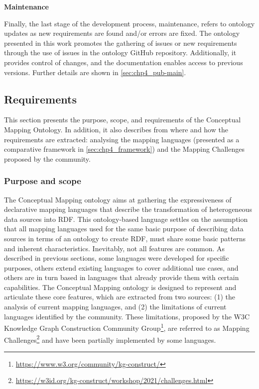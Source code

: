 \noindent\textbf{Maintenance}

Finally, the last stage of the development process, maintenance, refers to ontology updates as new requirements are found and/or errors are fixed. The ontology presented in this work promotes the gathering of issues or new requirements through the use of issues in the ontology GitHub repository. Additionally, it provides control of changes, and the documentation enables access to previous versions. Further details are shown in \cref{sec:chp4_pub-main}.



\subsection{Requirements}
\label{sec:chp4_requirements}

This section presents the purpose, scope, and requirements of the Conceptual Mapping Ontology. In addition, it also describes from where and how the requirements are extracted: analysing the mapping languages (presented as a comparative framework in \cref{sec:chp4_framework}) and the Mapping Challenges proposed by the community.

\subsubsection{Purpose and scope}

The Conceptual Mapping ontology aims at gathering the expressiveness of declarative mapping languages that describe the transformation of heterogeneous data sources into RDF. This ontology-based language settles on the assumption that all mapping languages used for the same basic purpose of describing data sources in terms of an ontology to create RDF, must share some basic patterns and inherent characteristics. Inevitably, not all features are common. As described in previous sections, some languages were developed for specific purposes, others extend existing languages to cover additional use cases, and others are in turn based in languages that already provide them with certain capabilities. The Conceptual Mapping ontology is designed to represent and articulate these core features, which are extracted from two sources: (1) the analysis of current mapping languages, and (2) the limitations of current languages identified by the community. These limitations, proposed by the W3C Knowledge Graph Construction Community Group\footnote{\label{foot:kgc}\url{https://www.w3.org/community/kg-construct/}}, are referred to as Mapping Challenges\footnote{\label{foot:challenges}\url{https://w3id.org/kg-construct/workshop/2021/challenges.html}} and have been partially implemented by some languages. %

